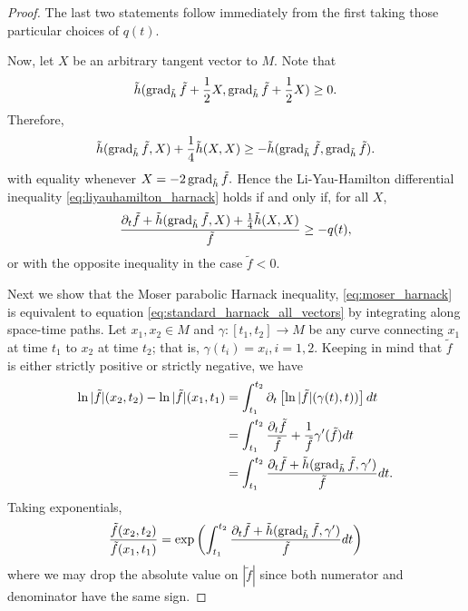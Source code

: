 \begin{proof}
The last two statements follow immediately from the first taking those particular choices of $q(t)$.

Now, let $X$ be an arbitrary tangent vector to $M$. Note that
\[\tilde{h}(\operatorname{grad}_{\tilde{h}} \tilde{f} + \frac{1}{2}X, \operatorname{grad}_{\tilde{h}} \tilde{f} + \frac{1}{2}X)\geq 0.\]
Therefore,
\[
\tilde{h}(\operatorname{grad}_{\tilde{h}} \tilde{f}, X) + \frac{1}{4} \tilde{h}(X, X) \geq - \tilde{h}(\operatorname{grad}_{\tilde{h}} \tilde{f}, \operatorname{grad}_{\tilde{h}} \tilde{f}).
\]
with equality whenever $X=-2\operatorname{grad}_{\tilde{h}} \tilde{f}.$
Hence the Li-Yau-Hamilton differential inequality \eqref{eq:liyauhamilton_harnack} holds if and only if, for all $X$,
\begin{equation}
\label{eq:standard_harnack_all_vectors}
\frac{\partial_t \tilde{f} + \tilde{h}(\operatorname{grad}_{\tilde{h}} \tilde{f}, X)+ \frac{1}{4} \tilde{h}(X, X)}{\tilde{f}} \geq - q(t),
\end{equation}
or with the opposite inequality in the case $\tilde{f} < 0$.

Next we show that the Moser parabolic Harnack inequality, \eqref{eq:moser_harnack} is equivalent to equation \eqref{eq:standard_harnack_all_vectors} by integrating along space-time paths. Let $x_1,x_2 \in M$ and $\gamma : [t_1, t_2] \to M$ be any curve connecting $x_1$ at time $t_1$ to $x_2$ at time $t_2$; that is, $\gamma(t_i) = x_i, i = 1,2$. Keeping in mind that $\tilde{f}$ is either strictly positive or strictly negative, we have
\[
\begin{split}
\ln |\tilde{f}| (x_2, t_2) - \ln |\tilde{f}| (x_1, t_1) &= \int_{t_1}^{t_2} \partial_t \left[\ln |\tilde{f}| (\gamma(t), t))\right] dt \\
&= \int_{t_1}^{t_2} \frac{\partial_t \tilde{f}}{\tilde{f}} + \frac{1}{\tilde{f}} \gamma'(\tilde{f})  dt \\
&= \int_{t_1}^{t_2} \frac{\partial_t \tilde{f} + \tilde{h} (\operatorname{grad}_{\tilde{h}} \tilde{f}, \gamma')}{\tilde{f}} dt.
\end{split}
\]
Taking exponentials,
\begin{equation}
\label{eq:exponential_harnack}
\frac{\tilde{f} (x_2, t_2)}{\tilde{f} (x_1, t_1)} = \exp \left(\int_{t_1}^{t_2} \frac{\partial_t \tilde{f} + \tilde{h} (\operatorname{grad}_{\tilde{h}} \tilde{f}, \gamma')}{\tilde{f}} dt\right)
\end{equation}
where we may drop the absolute value on $|\tilde{f}|$ since both numerator and denominator have the same sign.


\end{proof}

